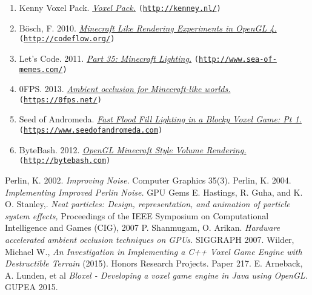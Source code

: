 \documentclass[a4paper,11pt,titlepage]{scrartcl}
\begin{document}
\begin{enumerate}
	\item Kenny Voxel Pack. {\em \href{http://kenney.nl/assets/voxel-pack}{Voxel Pack.}} \texttt{(\url{http://kenney.nl/})}
	\item Bösch, F. 2010. {\em \href{http://codeflow.org/entries/2010/dec/09/minecraft-like-rendering-experiments-in-opengl-4/#ambient-occlusion}{Minecraft Like Rendering Experiments in OpenGL 4.}} \texttt{(\url{http://codeflow.org/})}
	\item Let's Code. 2011. {\em \href{http://www.sea-of-memes.com/LetsCode35/LetsCode35.html}{Part 35: Minecraft Lighting.}} \texttt{(\url{http://www.sea-of-memes.com/})}
	\item 0FPS. 2013. {\em \href{https://0fps.net/2013/07/03/ambient-occlusion-for-minecraft-like-worlds/}{Ambient occlusion for Minecraft-like worlds.}} \texttt{(\url{https://0fps.net/})}
	\item Seed of Andromeda. {\em \href{https://www.seedofandromeda.com/blogs/29-fast-flood-fill-lighting-in-a-blocky-voxel-game-pt-1/}{Fast Flood Fill Lighting in a Blocky Voxel Game: Pt 1.}} \texttt{(\url{https://www.seedofandromeda.com})}
	\item ByteBash. 2012. {\em \href{http://bytebash.com/2012/03/opengl-volume-rendering/}{OpenGL Minecraft Style Volume Rendering.}} \texttt{(\url{http://bytebash.com})}
\end{enumerate}


\nocite{*}
\begin{thebibliography}{1}
	    
	 Perlin, K. 2002. {\em Improving Noise.} Computer Graphics 35(3).
	  Perlin, K. 2004. {\em Implementing Improved Perlin Noise.} GPU Gems
	  E. Hastings, R. Guha, and K. O. Stanley,. {\em Neat particles: Design, representation, and animation of particle system effects,} Proceedings of the IEEE Symposium on Computational Intelligence and Games (CIG), 2007
	 P. Shanmugam, O. Arikan. {\em Hardware accelerated ambient occlusion techniques on GPUs. }  SIGGRAPH 2007.
	  Wilder, Michael W., {\em An Investigation in Implementing a C++ Voxel Game Engine with Destructible Terrain } (2015). Honors Research Projects. Paper 217.
	 E. Arneback, A. Lunden, et al {\em Bloxel - Developing a voxel game engine in Java using OpenGL. } GUPEA 2015.
\end{thebibliography}

\clearpage
\end{document}
